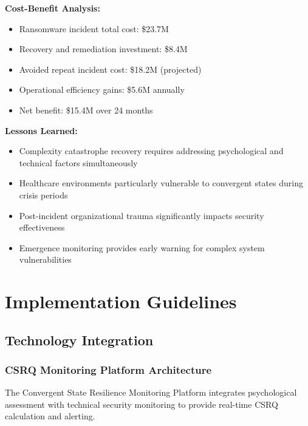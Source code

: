 \documentclass[11pt,a4paper]{article}
\begin{document}
\textbf{Cost-Benefit Analysis:}
\begin{itemize}
\item Ransomware incident total cost: \$23.7M
\item Recovery and remediation investment: \$8.4M
\item Avoided repeat incident cost: \$18.2M (projected)
\item Operational efficiency gains: \$5.6M annually
\item Net benefit: \$15.4M over 24 months
\end{itemize}

\textbf{Lessons Learned:}
\begin{itemize}
\item Complexity catastrophe recovery requires addressing psychological and technical factors simultaneously
\item Healthcare environments particularly vulnerable to convergent states during crisis periods
\item Post-incident organizational trauma significantly impacts security effectiveness
\item Emergence monitoring provides early warning for complex system vulnerabilities
\end{itemize}

\section{Implementation Guidelines}

\subsection{Technology Integration}

\subsubsection{CSRQ Monitoring Platform Architecture}

The Convergent State Resilience Monitoring Platform integrates psychological assessment with technical security monitoring to provide real-time CSRQ calculation and alerting.
\end{document}
